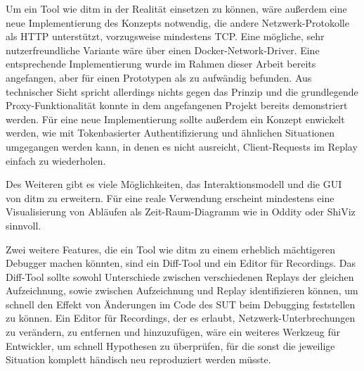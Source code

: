 \documentclass[12pt,a4paper]{report}
\begin{document}
Um ein Tool wie ditm in der Realität einsetzen zu können, wäre außerdem eine neue Implementierung des Konzepts notwendig, die
andere Netzwerk-Protokolle als HTTP unterstützt, vorzugsweise mindestens TCP. Eine mögliche, sehr nutzerfreundliche Variante wäre
über einen Docker-Network-Driver. Eine entsprechende Implementierung wurde im Rahmen dieser Arbeit bereits angefangen, aber für
einen Prototypen als zu aufwändig befunden. Aus technischer Sicht spricht allerdings nichts gegen das Prinzip und die grundlegende
Proxy-Funktionalität konnte in dem angefangenen Projekt bereits demonstriert werden. Für eine neue Implementierung sollte außerdem
ein Konzept enwickelt werden, wie mit Tokenbasierter Authentifizierung und ähnlichen Situationen umgegangen werden kann, in denen
es nicht ausreicht, Client-Requests im Replay einfach zu wiederholen.

Des Weiteren gibt es viele Möglichkeiten, das Interaktionsmodell und die GUI von ditm zu erweitern. Für eine reale Verwendung
erscheint mindestens eine Visualisierung von Abläufen als Zeit-Raum-Diagramm wie in Oddity \cite{oddity_graphical_debugger} oder
ShiViz \cite{ShiViz_visual_debugger} sinnvoll.

Zwei weitere Features, die ein Tool wie ditm zu einem erheblich mächtigeren Debugger machen könnten, sind ein Diff-Tool und ein
Editor für Recordings. Das Diff-Tool sollte sowohl Unterschiede zwischen verschiedenen Replays der gleichen Aufzeichnung, sowie
zwischen Aufzeichnung und Replay identifizieren können, um schnell den Effekt von Änderungen im Code des SUT beim Debugging
feststellen zu können. Ein Editor für Recordings, der es erlaubt, Netzwerk-Unterbrechungen zu verändern, zu entfernen und
hinzuzufügen, wäre ein weiteres Werkzeug für Entwickler, um schnell Hypothesen zu überprüfen, für die sonst die jeweilige
Situation komplett händisch neu reproduziert werden müsste.

\end{document}
